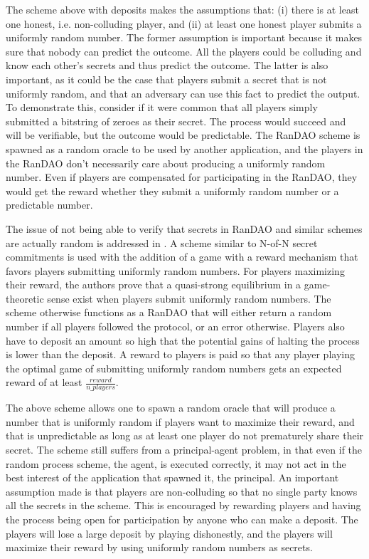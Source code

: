 The scheme above with deposits makes the assumptions that: (i) there is at least one honest, i.e. non-colluding player, and (ii) at least one honest player submits a uniformly random number. The former assumption is important because it makes sure that nobody can predict the outcome. All the players could be colluding and know each other's secrets and thus predict the outcome. The latter is also important, as it could be the case that players submit a secret that is not uniformly random, and that an adversary can use this fact to predict the output. To demonstrate this, consider if it were common that all players simply submitted a bitstring of zeroes as their secret. The process would succeed and will be verifiable, but the outcome would be predictable. The RanDAO scheme is spawned as a random oracle to be used by another application, and the players in the RanDAO don't necessarily care about producing a uniformly random number. Even if players are compensated for participating in the RanDAO, they would get the reward whether they submit a uniformly random number or a predictable number.

The issue of not being able to verify that secrets in RanDAO and similar schemes are actually random is addressed in \cite{chatterjee_probabilistic_2019}. A scheme similar to N-of-N secret commitments is used with the addition of a game with a reward mechanism that favors players submitting uniformly random numbers. For players maximizing their reward, the authors prove that a quasi-strong equilibrium in a game-theoretic sense exist when players submit uniformly random numbers. The scheme otherwise functions as a RanDAO that will either return a random number if all players followed the protocol, or an error otherwise. Players also have to deposit an amount so high that the potential gains of halting the process is lower than the deposit. A reward to players is paid so that any player playing the optimal game of submitting uniformly random numbers gets an expected reward of at least $\frac{reward}{n\_players}$. 

The above scheme allows one to spawn a random oracle that will produce a number that is uniformly random if players want to maximize their reward, and that is unpredictable as long as at least one player do not prematurely share their secret. The scheme still suffers from a principal-agent problem, in that even if the random process scheme, the agent, is executed correctly, it may not act in the best interest of the application that spawned it, the principal. An important assumption made is that players are non-colluding so that no single party knows all the secrets in the scheme. This is encouraged by rewarding players and having the process being open for participation by anyone who can make a deposit. The players will lose a large deposit by playing dishonestly, and the players will maximize their reward by using uniformly random numbers as secrets.

